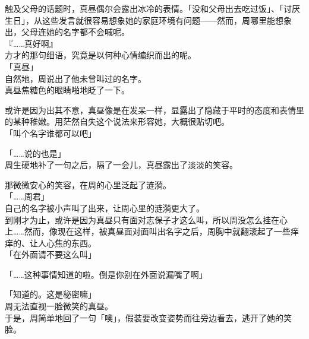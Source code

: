 触及父母的话题时，真昼偶尔会露出冰冷的表情。「没和父母出去吃过饭」、「讨厌生日」，从这些发言就很容易想象她的家庭环境有问题——然而，周哪里能想象出，父母连她的名字都不会喊呢。\\

『……真好啊』\\

方才的那句细语，究竟是以何种心情编织而出的呢。\\

「真昼」\\

自然地，周说出了他未曾叫过的名字。\\

真昼焦糖色的眼睛啪地眨了一下。

或许是因为出其不意，真昼像是在发呆一样，显露出了隐藏于平时的态度和表情里的某种稚嫩。用茫然自失这个说法来形容她，大概很贴切吧。\\

「叫个名字谁都可以吧」

「……说的也是」\\

周生硬地补了一句之后，隔了一会儿，真昼露出了淡淡的笑容。

那微微安心的笑容，在周的心里泛起了涟漪。\\

「……周君」\\

自己的名字被小声叫了出来，让周心里的涟漪更大了。\\

到刚才为止，或许是因为真昼只有面对志保子才这么叫，所以周没怎么挂在心上……然而，像现在这样，被真昼面对面叫出名字之后，周胸中就翻滚起了一些痒痒的、让人心焦的东西。\\

「在外面请不要这么叫」

「……这种事情知道的啦。倒是你别在外面说漏嘴了啊」

「知道的。这是秘密嘛」\\

周无法直视一脸微笑的真昼。\\

于是，周简单地回了一句「噢」，假装要改变姿势而往旁边看去，逃开了她的笑脸。
